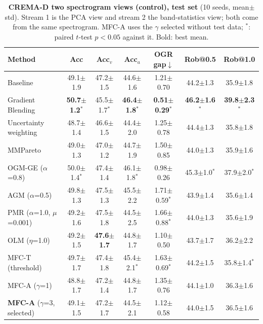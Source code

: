 \documentclass[fleqn,10pt]{wlscirep}
\newcommand{\pmm}{$\pm$} %
\begin{document}
\begin{table}[t]
\caption{\textbf{CREMA-D two spectrogram views (control), test set} (10 seeds, mean\pmm std). Stream 1 is the PCA view and stream 2 the band-statistics view; both come from the same spectrogram. MFC-A uses the $\gamma$ selected without test data; $^{*}$: paired $t$-test $p<0.05$ against it. Bold: best mean.}
\label{tab:main_spec}
\centering
\footnotesize
\begin{tabular}{@{}lcccccc@{}}
\toprule
\textbf{Method} & \textbf{Acc} & \textbf{Acc$_v$} & \textbf{Acc$_a$} & \textbf{OGR gap}$\downarrow$ & \textbf{Rob@0.5} & \textbf{Rob@1.0} \\ \midrule
Baseline & 49.1$\pm$1.9 & 47.2$\pm$1.5 & 44.6$\pm$1.6 & 1.21$\pm$0.70 & 44.2$\pm$1.3 & 35.9$\pm$1.8 \\
Gradient Blending & \textbf{50.7$\pm$1.2$^{*}$} & 45.5$\pm$1.7$^{*}$ & \textbf{46.4$\pm$1.8$^{*}$} & \textbf{0.51$\pm$0.29$^{*}$} & \textbf{46.2$\pm$1.6$^{*}$} & \textbf{39.8$\pm$2.3$^{*}$} \\
Uncertainty weighting & 48.7$\pm$1.4 & 46.6$\pm$1.5 & 44.4$\pm$2.0 & 1.25$\pm$0.78 & 44.4$\pm$1.3 & 35.8$\pm$1.8 \\
MMPareto & 49.0$\pm$1.3 & 47.0$\pm$1.2 & 44.7$\pm$1.9 & 1.50$\pm$0.85 & 44.0$\pm$1.3 & 35.9$\pm$1.6 \\
OGM-GE ($\alpha$=0.8) & 50.0$\pm$1.4$^{*}$ & 47.4$\pm$1.4 & 46.1$\pm$1.8$^{*}$ & 0.98$\pm$0.26 & 45.3$\pm$1.0$^{*}$ & 37.9$\pm$2.0$^{*}$ \\
AGM ($\alpha$=0.5) & 49.8$\pm$1.3 & 47.5$\pm$1.3 & 45.5$\pm$2.2 & 1.71$\pm$0.59$^{*}$ & 43.9$\pm$1.4 & 35.6$\pm$1.4 \\
PMR ($\alpha$=1.0, $\mu$=0.001) & 49.2$\pm$1.6 & 47.5$\pm$1.8 & 44.5$\pm$2.5 & 1.66$\pm$0.88$^{*}$ & 44.0$\pm$1.3 & 35.6$\pm$1.9 \\
OLM ($\eta$=1.0) & 49.2$\pm$1.5 & \textbf{47.6$\pm$1.7} & 44.8$\pm$1.7 & 1.10$\pm$0.50 & 43.7$\pm$1.7 & 36.2$\pm$2.2 \\
MFC-T (threshold) & 49.7$\pm$1.7 & 47.4$\pm$1.8 & 45.4$\pm$2.1$^{*}$ & 1.63$\pm$0.69$^{*}$ & 44.2$\pm$1.5 & 35.8$\pm$1.4$^{*}$ \\
MFC-A ($\gamma$=1) & 48.8$\pm$1.7 & 47.2$\pm$1.4 & 44.8$\pm$1.7 & 1.35$\pm$0.76 & 44.1$\pm$1.0 & 36.3$\pm$1.6 \\
\textbf{MFC-A} ($\gamma$=3, selected) & 49.1$\pm$1.5 & 47.2$\pm$1.7 & 44.5$\pm$2.1 & 1.12$\pm$0.58 & 44.0$\pm$1.5 & 36.5$\pm$1.6 \\
\bottomrule
\end{tabular}
\end{table}
\end{document}
